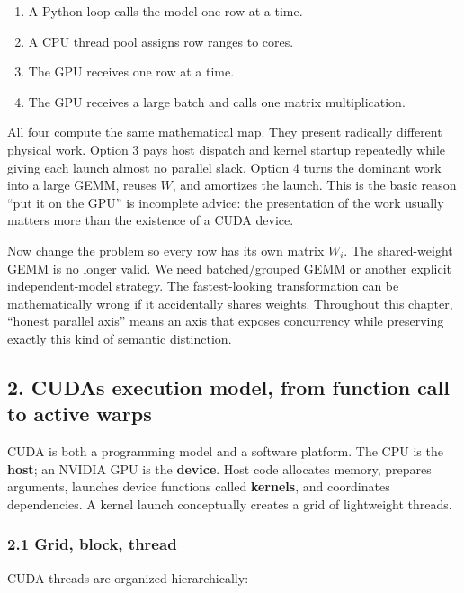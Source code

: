 \documentclass[
  10pt,
  letterpaper,
]{article}
\providecommand{\tightlist}{%
  \setlength{\itemsep}{0pt}\setlength{\parskip}{0pt}}
\begin{document}
\begin{enumerate}
\def\labelenumi{\arabic{enumi}.}
\tightlist
\item
  A Python loop calls the model one row at a time.
\item
  A CPU thread pool assigns row ranges to cores.
\item
  The GPU receives one row at a time.
\item
  The GPU receives a large batch and calls one matrix multiplication.
\end{enumerate}

All four compute the same mathematical map. They present radically
different physical work. Option 3 pays host dispatch and kernel startup
repeatedly while giving each launch almost no parallel slack. Option 4
turns the dominant work into a large GEMM, reuses \(W\), and amortizes
the launch. This is the basic reason ``put it on the GPU'' is incomplete
advice: the presentation of the work usually matters more than the
existence of a CUDA device.

Now change the problem so every row has its own matrix \(W_i\). The
shared-weight GEMM is no longer valid. We need batched/grouped GEMM or
another explicit independent-model strategy. The fastest-looking
transformation can be mathematically wrong if it accidentally shares
weights. Throughout this chapter, ``honest parallel axis'' means an axis
that exposes concurrency while preserving exactly this kind of semantic
distinction.

\subsection{2. CUDA\textquotesingle s execution model, from function
call to active
warps}\label{2-cudas-execution-model-from-function-call-to-active-warps}

CUDA is both a programming model and a software platform. The CPU is the
\textbf{host}; an NVIDIA GPU is the \textbf{device}. Host code allocates
memory, prepares arguments, launches device functions called
\textbf{kernels}, and coordinates dependencies. A kernel launch
conceptually creates a grid of lightweight threads.

\subsubsection{2.1 Grid, block, thread}\label{21-grid-block-thread}

CUDA threads are organized hierarchically:
\end{document}
